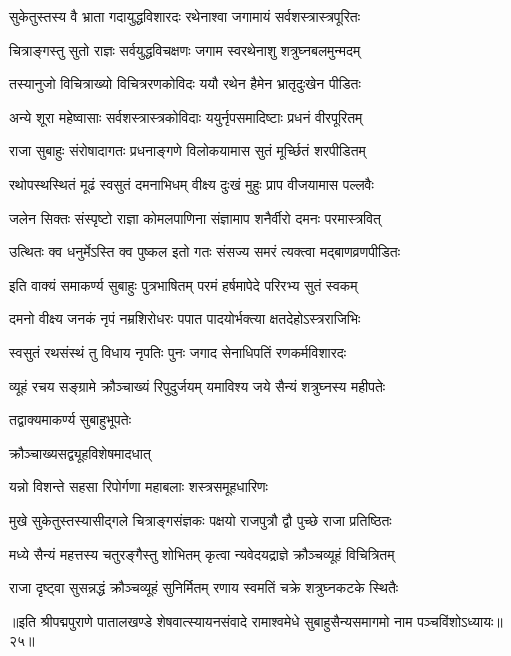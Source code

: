\twolineshloka
{सुकेतुस्तस्य वै भ्राता गदायुद्धविशारदः}
{रथेनाश्वा जगामायं सर्वशस्त्रास्त्रपूरितः}%

\twolineshloka
{चित्राङ्गस्तु सुतो राज्ञः सर्वयुद्धविचक्षणः}
{जगाम स्वरथेनाशु शत्रुघ्नबलमुन्मदम्}%

\twolineshloka
{तस्यानुजो विचित्राख्यो विचित्ररणकोविदः}
{ययौ रथेन हैमेन भ्रातृदुःखेन पीडितः}%

\twolineshloka
{अन्ये शूरा महेष्वासाः सर्वशस्त्रास्त्रकोविदाः}
{ययुर्नृपसमादिष्टाः प्रधनं वीरपूरितम्}%

\twolineshloka
{राजा सुबाहुः संरोषादागतः प्रधनाङ्गणे}
{विलोकयामास सुतं मूर्च्छितं शरपीडितम्}%

\twolineshloka
{रथोपस्थस्थितं मूढं स्वसुतं दमनाभिधम्}
{वीक्ष्य दुःखं मुहुः प्राप वीजयामास पल्लवैः}%

\twolineshloka
{जलेन सिक्तः संस्पृष्टो राज्ञा कोमलपाणिना}
{संज्ञामाप शनैर्वीरो दमनः परमास्त्रवित्}%

\twolineshloka
{उत्थितः क्व धनुर्मेऽस्ति क्व पुष्कल इतो गतः}
{संसज्य समरं त्यक्त्वा मद्बाणव्रणपीडितः}%

\twolineshloka
{इति वाक्यं समाकर्ण्य सुबाहुः पुत्रभाषितम्}
{परमं हर्षमापेदे परिरभ्य सुतं स्वकम्}%

\twolineshloka
{दमनो वीक्ष्य जनकं नृपं नम्रशिरोधरः}
{पपात पादयोर्भक्त्या क्षतदेहोऽस्त्रराजिभिः}%

\twolineshloka
{स्वसुतं रथसंस्थं तु विधाय नृपतिः पुनः}
{जगाद सेनाधिपतिं रणकर्मविशारदः}%

\twolineshloka
{व्यूहं रचय सङ्ग्रामे क्रौञ्चाख्यं रिपुदुर्जयम्}
{यमाविश्य जये सैन्यं शत्रुघ्नस्य महीपतेः}%

तद्वाक्यमाकर्ण्य सुबाहुभूपतेः

क्रौञ्चाख्यसद्व्यूहविशेषमादधात्

\twolineshloka
{यन्नो विशन्ते सहसा रिपोर्गणा}
{महाबलाः शस्त्रसमूहधारिणः}%

\twolineshloka
{मुखे सुकेतुस्तस्यासीद्गले चित्राङ्गसंज्ञकः}
{पक्षयो राजपुत्रौ द्वौ पुच्छे राजा प्रतिष्ठितः}%

\twolineshloka
{मध्ये सैन्यं महत्तस्य चतुरङ्गैस्तु शोभितम्}
{कृत्वा न्यवेदयद्राज्ञे क्रौञ्चव्यूहं विचित्रितम्}%

\twolineshloka
{राजा दृष्ट्वा सुसन्नद्धं क्रौञ्चव्यूहं सुनिर्मितम्}
{रणाय स्वमतिं चक्रे शत्रुघ्नकटके स्थितैः}%

॥इति श्रीपद्मपुराणे पातालखण्डे शेषवात्स्यायनसंवादे रामाश्वमेधे सुबाहुसैन्यसमागमो नाम पञ्चविंशोऽध्यायः॥२५॥


